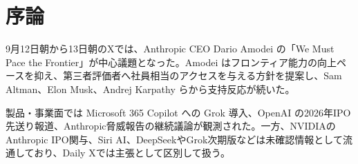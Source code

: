 \section{序論}
9月12日朝から13日朝のXでは、Anthropic CEO Dario Amodei の「We Must Pace the Frontier」が中心議題となった。Amodei はフロンティア能力の向上ペースを抑え、第三者評価者へ社員相当のアクセスを与える方針を提案し、Sam Altman、Elon Musk、Andrej Karpathy らから支持反応が続いた。

製品・事業面では Microsoft 365 Copilot への Grok 導入、OpenAI の2026年IPO先送り報道、Anthropic脅威報告の継続議論が観測された。一方、NVIDIAのAnthropic IPO関与、Siri AI、DeepSeekやGrok次期版などは未確認情報として流通しており、Daily Xでは主張として区別して扱う。
